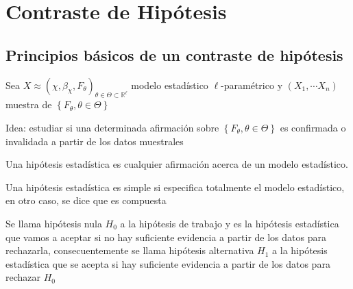 \section{Contraste de Hipótesis}

\subsection{Principios básicos de un contraste de hipótesis}
Sea $X \approx\left(\chi, \beta_{\chi}, F_{\theta}\right)_{\theta \in \Theta \subset \mathbb{R}^{\ell}}$ modelo estadístico $\ell$-paramétrico y $\left(X_{1}, \cdots X_{n}\right)$ muestra de $\left\{F_{\theta}, \theta \in \Theta\right\}$

Idea: estudiar si una determinada afirmación sobre $\left\{F_{\theta}, \theta \in \Theta\right\}$ es confirmada o invalidada a partir de los datos muestrales


\begin{definición} 
Una hipótesis estadística es cualquier afirmación acerca de un modelo estadístico.
\end{definición}


\begin{definición} 
    Una hipótesis estadística es simple si especifica totalmente el modelo estadístico, en otro caso, se dice que es compuesta
\end{definición}

\begin{definición} 
Se llama hipótesis nula $H_{0}$ a la hipótesis de trabajo y es la hipótesis estadística que vamos a aceptar si no hay suficiente evidencia a partir de los datos para rechazarla, consecuentemente se llama hipótesis alternativa $H_{1}$ a la hipótesis estadística que se acepta si hay suficiente evidencia a partir de los datos para rechazar $H_{0}$
\end{definición}


